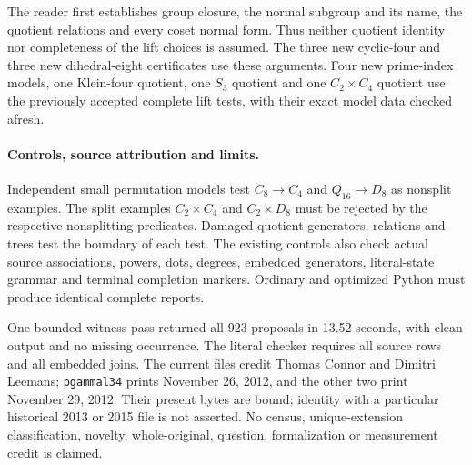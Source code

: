 \documentclass[11pt]{article}
\begin{document}
The reader first establishes group closure, the normal subgroup and its
name, the quotient relations and every coset normal form. Thus neither
quotient identity nor completeness of the lift choices is assumed.
The three new cyclic-four and three new dihedral-eight certificates use
these arguments. Four new prime-index models, one Klein-four quotient,
one $S_3$ quotient and one $C_2\times C_4$ quotient use the previously
accepted complete lift tests, with their exact model data checked afresh.

\paragraph{Controls, source attribution and limits.}
Independent small permutation models test $C_8\to C_4$ and
$Q_{16}\to D_8$ as nonsplit examples. The split examples
$C_2\times C_4$ and $C_2\times D_8$ must be rejected by the respective
nonsplitting predicates. Damaged quotient generators, relations and
trees test the boundary of each test. The existing controls also check
actual source associations, powers, dots, degrees, embedded generators,
literal-state grammar and terminal completion markers.
Ordinary and optimized Python must produce identical complete reports.

One bounded witness pass returned all 923 proposals in 13.52 seconds,
with clean output and no missing occurrence. The literal checker requires
all source rows and all embedded joins. The current files credit Thomas
Connor and Dimitri Leemans; \texttt{pgammal34} prints November 26, 2012,
and the other two print November 29, 2012. Their present bytes are bound;
identity with a particular historical 2013 or 2015 file is not asserted.
No census, unique-extension classification, novelty, whole-original,
question, formalization or measurement credit is claimed.
\end{document}
